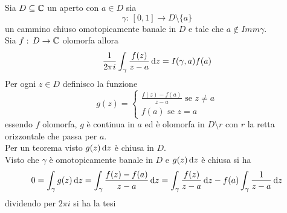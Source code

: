 \begin{thm}\bianco
Sia $D\subseteq \mathbb{C}$ un aperto con $a\in D$ sia 
$$ \gamma:\, [0,1]\to D\setminus \{a\}$$ 
un cammino chiuso omotopicamente banale in $D$ e tale che $a\not \in Imm \gamma$.\\
Sia $f:\, D\to \mathbb{C}$ olomorfa allora 
$$ \frac{1}{2\pi i }\int_\gamma \frac{f(z)}{z-a}\, \mathrm{d}z = I(\gamma,a) f(a)$$
\proof Per ogni $z\in D$ definisco la funzione 
$$ g(z) =\begin{cases}\frac{f(z) - f(a)}{z-a} \text{ se } z\neq a \\
f(a) \text{ se } z=a
\end{cases}$$
essendo $f$ olomorfa, $g$ \`e continua in $a$ ed \`e olomorfa in $D\setminus r$ con $r$ la retta orizzontale che passa per $a$.\\
Per un teorema visto $g(z) \, \mathrm{d}z$ \`e chiusa in $D$.\\
Visto che $\gamma$ \`e omotopicamente banale in $D$  e $g(z) \, \mathrm{d}z $ \`e chiusa si ha 
$$ 0 =\int_\gamma g(z) \, \mathrm{d}z= \int_\gamma \frac{f(z) -f(a)}{z-a}\, \mathrm{d}z = \int_\gamma \frac{f(z)}{z-a}\, \mathrm{d}z - f(a) \int_\gamma \frac{1}{z-a}\, \mathrm{d}z $$
dividendo per $2\pi i$ si ha la tesi \endproof 
\end{thm}
